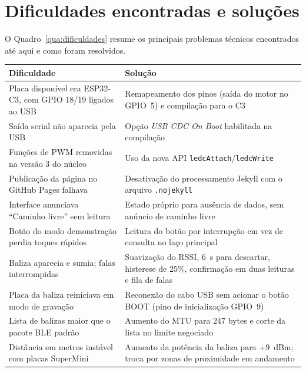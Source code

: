 \section{Dificuldades encontradas e soluções}
\label{sec:res-dificuldades}

O Quadro~\ref{qua:dificuldades} resume os principais problemas técnicos encontrados até aqui e como foram resolvidos.

\begin{quadro}[htb]
\caption{Dificuldades encontradas e soluções adotadas}
\label{qua:dificuldades}
\small
\begin{tabular}{|p{6.4cm}|p{7.6cm}|}
\hline
\textbf{Dificuldade} & \textbf{Solução} \\
\hline
Placa disponível era ESP32-C3, com GPIO 18/19 ligados ao USB & Remapeamento dos pinos (saída do motor no GPIO~5) e compilação para o C3 \\
\hline
Saída serial não aparecia pela USB & Opção \textit{USB CDC On Boot} habilitada na compilação \\
\hline
Funções de PWM removidas na versão 3 do núcleo & Uso da nova API \texttt{ledcAttach}/\texttt{ledcWrite} \\
\hline
Publicação da página no GitHub Pages falhava & Desativação do processamento Jekyll com o arquivo \texttt{.nojekyll} \\
\hline
Interface anunciava ``Caminho livre'' sem leitura & Estado próprio para ausência de dados, sem anúncio de caminho livre \\
\hline
Botão do modo demonstração perdia toques rápidos & Leitura do botão por interrupção em vez de consulta no laço principal \\
\hline
Baliza aparecia e sumia; falas interrompidas & Suavização do RSSI, 6~s para descartar, histerese de 25\%, confirmação em duas leituras e fila de falas \\
\hline
Placa da baliza reiniciava em modo de gravação & Reconexão do cabo USB sem acionar o botão BOOT (pino de inicialização GPIO~9) \\
\hline
Lista de balizas maior que o pacote BLE padrão & Aumento do MTU para 247 bytes e corte da lista no limite negociado \\
\hline
Distância em metros instável com placas SuperMini & Aumento da potência da baliza para +9~dBm; troca por zonas de proximidade em andamento \\
\hline
\end{tabular}
\normalsize
{}
\end{quadro}
